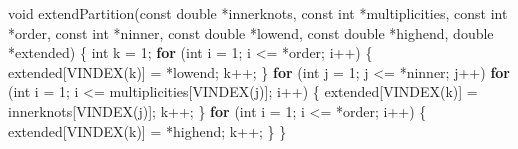 \documentclass[
  12pt,
  letterpaper,
  DIV=11,
  numbers=noendperiod]{scrreprt}
\newenvironment{Shaded}{\begin{snugshade}}{\end{snugshade}}
\newcommand{\ControlFlowTok}[1]{\textcolor[rgb]{0.00,0.23,0.31}{\textbf{#1}}}
\newcommand{\DataTypeTok}[1]{\textcolor[rgb]{0.68,0.00,0.00}{#1}}
\newcommand{\DecValTok}[1]{\textcolor[rgb]{0.68,0.00,0.00}{#1}}
\newcommand{\NormalTok}[1]{\textcolor[rgb]{0.00,0.23,0.31}{#1}}
\newcommand{\OperatorTok}[1]{\textcolor[rgb]{0.37,0.37,0.37}{#1}}
\theoremstyle{remark}
\begin{document}
\begin{Shaded}
\begin{Highlighting}[]
\DataTypeTok{void}\NormalTok{ extendPartition}\OperatorTok{(}\DataTypeTok{const} \DataTypeTok{double} \OperatorTok{*}\NormalTok{innerknots}\OperatorTok{,} \DataTypeTok{const} \DataTypeTok{int} \OperatorTok{*}\NormalTok{multiplicities}\OperatorTok{,}
                     \DataTypeTok{const} \DataTypeTok{int} \OperatorTok{*}\NormalTok{order}\OperatorTok{,} \DataTypeTok{const} \DataTypeTok{int} \OperatorTok{*}\NormalTok{ninner}\OperatorTok{,} \DataTypeTok{const} \DataTypeTok{double} \OperatorTok{*}\NormalTok{lowend}\OperatorTok{,}
                     \DataTypeTok{const} \DataTypeTok{double} \OperatorTok{*}\NormalTok{highend}\OperatorTok{,} \DataTypeTok{double} \OperatorTok{*}\NormalTok{extended}\OperatorTok{)} \OperatorTok{\{}
    \DataTypeTok{int}\NormalTok{ k }\OperatorTok{=} \DecValTok{1}\OperatorTok{;}
    \ControlFlowTok{for} \OperatorTok{(}\DataTypeTok{int}\NormalTok{ i }\OperatorTok{=} \DecValTok{1}\OperatorTok{;}\NormalTok{ i }\OperatorTok{\textless{}=} \OperatorTok{*}\NormalTok{order}\OperatorTok{;}\NormalTok{ i}\OperatorTok{++)} \OperatorTok{\{}
\NormalTok{        extended}\OperatorTok{[}\NormalTok{VINDEX}\OperatorTok{(}\NormalTok{k}\OperatorTok{)]} \OperatorTok{=} \OperatorTok{*}\NormalTok{lowend}\OperatorTok{;}
\NormalTok{        k}\OperatorTok{++;}
    \OperatorTok{\}}
    \ControlFlowTok{for} \OperatorTok{(}\DataTypeTok{int}\NormalTok{ j }\OperatorTok{=} \DecValTok{1}\OperatorTok{;}\NormalTok{ j }\OperatorTok{\textless{}=} \OperatorTok{*}\NormalTok{ninner}\OperatorTok{;}\NormalTok{ j}\OperatorTok{++)}
        \ControlFlowTok{for} \OperatorTok{(}\DataTypeTok{int}\NormalTok{ i }\OperatorTok{=} \DecValTok{1}\OperatorTok{;}\NormalTok{ i }\OperatorTok{\textless{}=}\NormalTok{ multiplicities}\OperatorTok{[}\NormalTok{VINDEX}\OperatorTok{(}\NormalTok{j}\OperatorTok{)];}\NormalTok{ i}\OperatorTok{++)} \OperatorTok{\{}
\NormalTok{            extended}\OperatorTok{[}\NormalTok{VINDEX}\OperatorTok{(}\NormalTok{k}\OperatorTok{)]} \OperatorTok{=}\NormalTok{ innerknots}\OperatorTok{[}\NormalTok{VINDEX}\OperatorTok{(}\NormalTok{j}\OperatorTok{)];}
\NormalTok{            k}\OperatorTok{++;}
        \OperatorTok{\}}
    \ControlFlowTok{for} \OperatorTok{(}\DataTypeTok{int}\NormalTok{ i }\OperatorTok{=} \DecValTok{1}\OperatorTok{;}\NormalTok{ i }\OperatorTok{\textless{}=} \OperatorTok{*}\NormalTok{order}\OperatorTok{;}\NormalTok{ i}\OperatorTok{++)} \OperatorTok{\{}
\NormalTok{        extended}\OperatorTok{[}\NormalTok{VINDEX}\OperatorTok{(}\NormalTok{k}\OperatorTok{)]} \OperatorTok{=} \OperatorTok{*}\NormalTok{highend}\OperatorTok{;}
\NormalTok{        k}\OperatorTok{++;}
    \OperatorTok{\}}
\OperatorTok{\}}


\end{Highlighting}
\end{Shaded}
\end{document}
